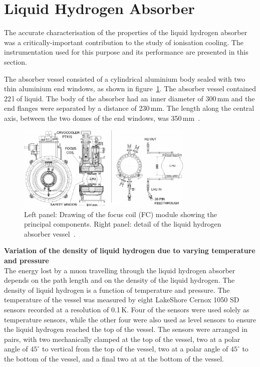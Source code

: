 \graphicspath{{07-Absorber/Figures/}}

\section{Liquid Hydrogen Absorber}
\label{Sect:Absorber}

The accurate characterisation of the properties of the liquid hydrogen
absorber was a critically-important contribution to the study of
ionisation cooling.
The instrumentation used for this purpose and its performance are
presented in this section.

The absorber vessel consisted of a cylindrical aluminium body sealed
with two thin aluminium end windows, as shown in
figure~\ref{Fig:AbsorberVessel:Diag}.
The absorber vessel contained 22\,l of liquid.
The body of the absorber had an inner diameter of 300\,mm and the end
flanges were separated by a distance of 230\,mm.  
The length along the central axis, between the
two domes of the end windows, was 350\,mm~\cite{1748-0221-13-09-T09008}. \\
\begin{figure}
  \begin{center}
    \includegraphics[width=0.75\textwidth]{AFC-drwng.pdf}
  \end{center}
  \caption{
    Left panel: Drawing of the focus coil (FC) module
    showing the principal components.
    Right panel: detail of the liquid hydrogen absorber vessel~\cite{1748-0221-13-09-T09008}.
  }
  \label{Fig:AbsorberVessel:Diag}
\end{figure}

\noindent\textbf{Variation of the density of liquid hydrogen due to
    varying temperature and pressure} \\
\noindent
The energy lost by a muon travelling through the liquid hydrogen
absorber depends on the path length and on
the density of the liquid hydrogen. The density of liquid hydrogen is
a function of temperature and pressure.  
The temperature of the vessel was measured by eight LakeShore Cernox
1050 SD sensors recorded at a resolution of 0.1\,K.
Four of the sensors were used solely as temperature sensors, while the
other four were also used as level sensors to ensure the
liquid hydrogen reached the top of the vessel. 
The sensors were arranged in pairs, with two mechanically clamped at
the top of the vessel, two at a polar angle of ${45}^{\circ}$ to
vertical from the top of the vessel, two at a polar angle of
${45}^{\circ}$ to the bottom of the vessel, and a
final two at at the bottom of the vessel. 

